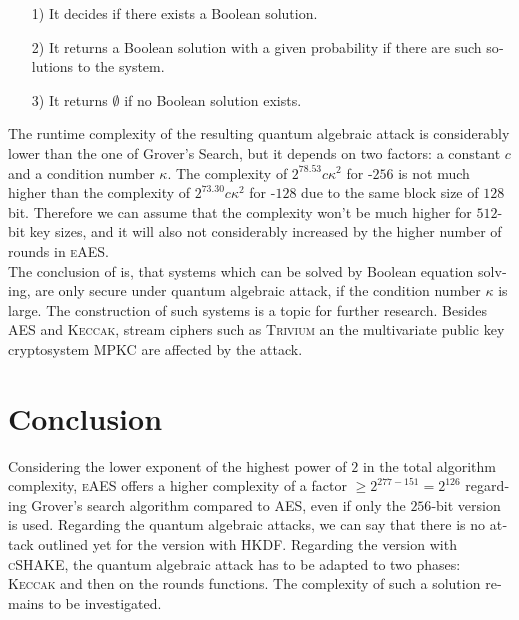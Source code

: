 \documentclass[a4paper,11pt]{article}
\begin{document}
\begin{otherlanguage}{english}
\begin{itemize} [noitemsep, nolistsep]
  \item[1)] It decides if there exists a Boolean solution.
  \vspace{0.1cm}
  \item[2)] It returns a Boolean solution with a given probability if there are such solutions to the system.
  \vspace{0.1cm}
  \item[3)] It returns $\emptyset$ if no Boolean solution exists.
\end{itemize}
\vspace{0.5cm}

\noindent
The runtime complexity of the resulting quantum algebraic attack is considerably lower than the one of Grover's Search, but it depends on two factors: a constant $c$ and a condition number $\kappa$. The complexity of $2^{78.53}c\kappa^2$ for -$256$ is not much higher than the complexity of $2^{73.30}c\kappa^2$ for -$128$ due to the same block size of $128$ bit. Therefore we can assume that the complexity won't be much higher for $512$-bit key sizes, and it will also not considerably increased by the higher number of rounds in \textsc{eAES}.\\


\noindent
The conclusion of \cite{QAA} is, that systems which can be solved by Boolean equation solving, are only secure under quantum algebraic attack, if the condition number $\kappa$ is large. The construction of such systems is a topic for further research. Besides \textsc{AES} and \textsc{Keccak}, stream ciphers such as \textsc{Trivium} an the multivariate public key cryptosystem \textsc{MPKC} are affected by the attack. \\

\section{Conclusion}

\noindent
Considering the lower exponent of the highest power of $2$ in the total algorithm complexity, \textsc{eAES} offers a higher complexity of a factor $\geq 2^{277-151}=2^{126}$ regarding Grover's search algorithm compared to  \textsc{AES}, even if only the $256$-bit version is used. Regarding the quantum algebraic attacks, we can say that there is no attack outlined yet for the version with \textsc{HKDF}. Regarding the version with \textsc{cSHAKE}, the quantum algebraic attack has to be adapted to two phases: \textsc{Keccak} and then on the rounds functions. The complexity of such a solution remains to be investigated.\\


\end{otherlanguage}
\end{document}
